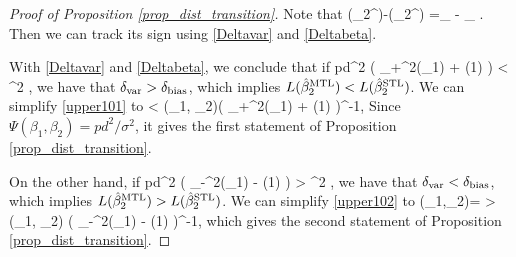 \begin{proof}[Proof of Proposition \ref{prop_dist_transition}]
Note that 
 \be\label{var-beta}\te(\hat{\beta}_2^{\STL})-\te(\hat{\beta}_2^{\MTL}) =\delta_{\vari} - \delta_{\bias} .\ee
Then we can track its sign using \eqref{Deltavar} and \eqref{Deltabeta}.

 With \eqref{Deltavar} and \eqref{Deltabeta}, we conclude that if
\be\label{upper101}pd^2 \cdot {} \cdot \left( \al_+^2(\rho_1) +  \oo(1) \right) < \sigma^2  \cdot {},\ee
	we have that $\delta_{\text{var}} > \delta_{\text{bias}}$, which implies $L(\hat{\beta}_2^{\text{MTL}})<L(\hat{\beta}_2^{\text{STL}})$. We can simplify \eqref{upper101} to
	\be\label{pos1}    <   \Phi(\rho_1, \rho_2)\cdot \left( \al_+^2(\rho_1) +  \oo(1) \right)^{-1}, \ee
Since $ \Psi(\beta_1,\beta_2)=pd^2/\sigma^2$, it gives the first statement of Proposition \ref{prop_dist_transition}.	
 	
 On the other hand, if
\be\label{upper102}pd^2 \cdot {} \cdot \left( \al_-^2(\rho_1) -  \oo(1) \right) > \sigma^2  \cdot {},\ee
	we have that $\delta_{\text{var}} < \delta_{\text{bias}}$, which implies $L(\hat{\beta}_2^{\text{MTL}})>L(\hat{\beta}_2^{\text{STL}})$. We can simplify \eqref{upper102} to
	\be\label{neg1} \Psi(\beta_1,\beta_2)=  >  \Phi(\rho_1, \rho_2) \cdot \left( \al_-^2(\rho_1) -  \oo(1) \right)^{-1}, \ee
which gives the second statement of Proposition \ref{prop_dist_transition}.
\end{proof}

